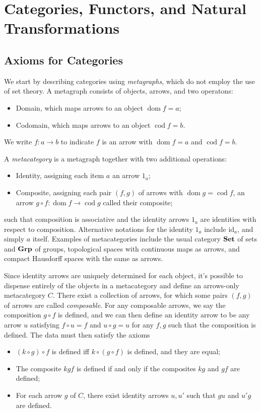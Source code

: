 \chapter{Categories, Functors, and Natural Transformations}

\section{Axioms for Categories}
We start by describing categories using \emph{metagraphs}, which do not employ the use of set theory. A metagraph consists of objects, arrows, and two operatons:
\begin{itemize}
	\item Domain, which maps arrows to an object $\operatorname{dom} f=a$;
	\item Codomain, which maps arrows to an object $\operatorname{cod} f=b$.
\end{itemize}
We write $f : a \to b$ to indicate $f$ is an arrow with $\operatorname{dom} f=a$ and $\operatorname{cod} f=b$.

A \emph{metacategory} is a metagraph together with two additional operations:
\begin{itemize}
	\item Identity, assigning each item $a$ an arrow $1_a$;
	\item Composite, assigning each pair $(f,g)$ of arrows with $\operatorname{dom} g=\operatorname{cod} f$, an arrow $g\circ f : \operatorname{dom} f \to \operatorname{cod} g$ called their composite;
\end{itemize}
such that composition is associative and the identity arrows $1_a$ are identities with respect to composition. Alternative notations for the identity $1_a$ include $\mathrm{id} _a$, and simply $a$ itself. Examples of metacategories include the usual category $\mathbf{Set} $ of sets and $\mathbf{Grp} $ of groups, topological spaces with continuous maps as arrows, and compact Hausdorff spaces with the same as arrows.

Since identity arrows are uniquely determined for each object, it's possible to dispense entirely of the objects in a metacategory and define an arrows-only metacategory $C$. There exist a collection of arrows, for which some pairs $(f,g)$ of arrows are called \emph{composable}. For any composable arrows, we say the composition $g\circ f$ is defined, and we can then define an identity arrow to be any arrow $u$ satisfying $f\circ u=f$ and $u\circ g=u$ for any $f,g$ such that the composition is defined. The data must then satisfy the axioms
\begin{itemize}
	\item $(k\circ g)\circ f$ is defined iff $k\circ (g\circ f)$ is defined, and they are equal;
	\item The composite $kgf$ is defined if and only if the composites $kg$ and $gf$ are defined;
	\item For each arrow $g$ of $C$, there exist identity arrows $u,u'$ such that $gu$ and $u'g$ are defined.
\end{itemize}

